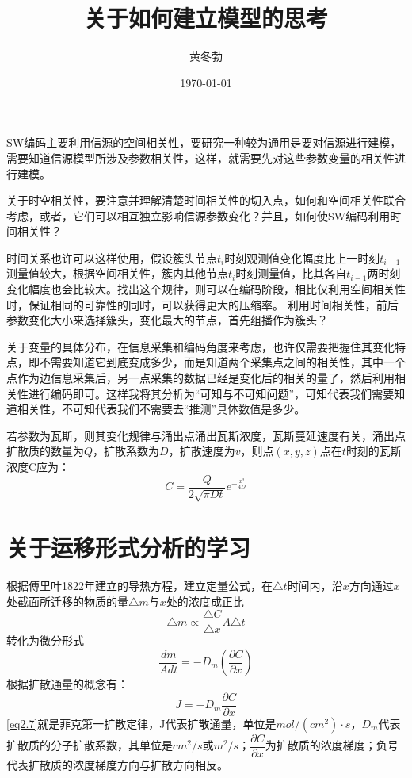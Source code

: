\documentclass[UTF8]{ctexart}
\title{\heiti 关于如何建立模型的思考}
\author{\kaishu 黄冬勃}
\date{\today}
\theoremstyle{plain}
\begin{document}
\maketitle
\tableofcontents

\cite{Ali2007}
SW编码主要利用信源的空间相关性，要研究一种较为通用是要对信源进行建模，需要知道信源模型所涉及参数相关性，这样，就需要先对这些参数变量的相关性进行建模。

关于时空相关性，要注意并理解清楚时间相关性的切入点，如何和空间相关性联合考虑，或者，它们可以相互独立影响信源参数变化？并且，如何使SW编码利用时间相关性？ 


时间关系也许可以这样使用，假设簇头节点$t_i$时刻观测值变化幅度比上一时刻$t_{i-1}$测量值较大，根据空间相关性，簇内其他节点$t_i$时刻测量值，比其各自$t_{i-1}$两时刻变化幅度也会比较大。找出这个规律，则可以在编码阶段，相比仅利用空间相关性时，保证相同的可靠性的同时，可以获得更大的压缩率。
利用时间相关性，前后参数变化大小来选择簇头，变化最大的节点，首先组播作为簇头？

关于变量的具体分布，在信息采集和编码角度来考虑，也许仅需要把握住其变化特点，即不需要知道它到底变成多少，而是知道两个采集点之间的相关性，其中一个点作为边信息采集后，另一点采集的数据已经是变化后的相关的量了，然后利用相关性进行编码即可。这样我将其分析为``可知与不可知问题''，可知代表我们需要知道相关性，不可知代表我们不需要去``推测''具体数值是多少。

若参数为瓦斯，则其变化规律与涌出点涌出瓦斯浓度，瓦斯蔓延速度有关，涌出点扩散质的数量为$Q$，扩散系数为$D$，扩散速度为$v$，则点$(x,y,z)$点在$t$时刻的瓦斯浓度C应为：
\begin{equation*}
    C=\dfrac{Q}{2\sqrt{\pi D t}}e^{-\frac{x^2}{4D}}
\end{equation*}

\section{关于运移形式分析的学习}
根据傅里叶1822年建立的导热方程，建立定量公式，在$\triangle t$时间内，沿$x$方向通过$x$处截面所迁移的物质的量$\triangle m$与$x$处的浓度\textcolor[rgb]{1,0,0}{成正比}
\begin{equation*}
    \triangle m \propto \dfrac{\triangle C}{\triangle x} A \triangle t
\end{equation*}
转化为微分形式
\begin{equation*}
    \dfrac{dm}{Adt} = - D_m\left(\dfrac{\partial C}{\partial x}\right)
\end{equation*}
根据扩散通量的概念有：
\begin{equation}
    J = -D_m\dfrac{\partial C}{ \partial x}
    \label{eq2.7}
\end{equation}
\cref{eq2.7}就是\textcolor[rgb]{1,0,0}{菲克第一扩散定律}，J代表扩散通量，单位是$mol/(cm^2)\cdot s$，$D_m$代表扩散质的分子扩散系数，其单位是$cm^2/s$或$m^2/s$；$\dfrac{\partial C}{\partial x}$为扩散质的浓度梯度；负号代表扩散质的浓度梯度方向与扩散方向相反。
\end{document}
